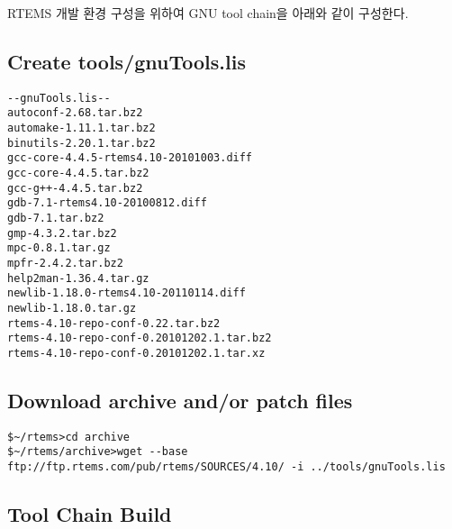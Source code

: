 \documentclass[11pt
  , a4paper
  , article
  , oneside
]{memoir}
\begin{document}
RTEMS 개발 환경 구성을 위하여 GNU tool chain\cite{rtems}\cite{rtems_download}을 아래와 같이 구성한다.

\subsection*{Create tools/gnuTools.lis}
\begin{lstlisting}[style=termstyle]
--gnuTools.lis--
autoconf-2.68.tar.bz2
automake-1.11.1.tar.bz2
binutils-2.20.1.tar.bz2
gcc-core-4.4.5-rtems4.10-20101003.diff
gcc-core-4.4.5.tar.bz2
gcc-g++-4.4.5.tar.bz2
gdb-7.1-rtems4.10-20100812.diff
gdb-7.1.tar.bz2
gmp-4.3.2.tar.bz2
mpc-0.8.1.tar.gz
mpfr-2.4.2.tar.bz2
help2man-1.36.4.tar.gz
newlib-1.18.0-rtems4.10-20110114.diff
newlib-1.18.0.tar.gz
rtems-4.10-repo-conf-0.22.tar.bz2
rtems-4.10-repo-conf-0.20101202.1.tar.bz2
rtems-4.10-repo-conf-0.20101202.1.tar.xz
\end{lstlisting}

\subsection*{Download archive and/or patch files}
\begin{lstlisting}[style=termstyle]
$~/rtems>cd archive
$~/rtems/archive>wget --base ftp://ftp.rtems.com/pub/rtems/SOURCES/4.10/ -i ../tools/gnuTools.lis
\end{lstlisting}

\subsection*{Tool Chain Build}
\end{document}
